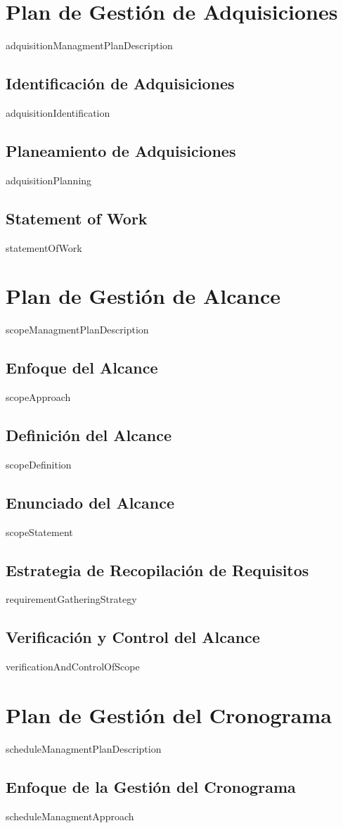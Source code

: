 \documentclass{article}
\begin{document}
\section{Plan de Gestión de Adquisiciones}
{{adquisitionManagmentPlanDescription}}
\subsection{Identificación de Adquisiciones}
{{adquisitionIdentification}}
\subsection{Planeamiento de Adquisiciones}
{{adquisitionPlanning}}
\subsection{Statement of Work}
{{statementOfWork}}
\section{Plan de Gestión de Alcance}
{{scopeManagmentPlanDescription}}
\subsection{Enfoque del Alcance}
{{scopeApproach}}
\subsection{Definición del Alcance}
{{scopeDefinition}}
\subsection{Enunciado del Alcance}
{{scopeStatement}}
\subsection{Estrategia de Recopilación de Requisitos}
{{requirementGatheringStrategy}}
\subsection{Verificación y Control del Alcance}
{{verificationAndControlOfScope}}
\section{Plan de Gestión del Cronograma}
{{scheduleManagmentPlanDescription}}
\subsection{Enfoque de la Gestión del Cronograma}
{{scheduleManagmentApproach}}
\end{document}
